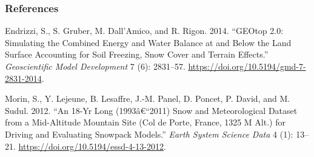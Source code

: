 \documentclass[
]{article}
\newlength{\cslhangindent}
\newenvironment{cslreferences}%
  {\setlength{\parindent}{0pt}%
  \everypar{\setlength{\hangindent}{\cslhangindent}}\ignorespaces}%
  {\par}
\begin{document}
\hypertarget{references}{%
\subsubsection*{References}\label{references}}

\hypertarget{refs}{}
\begin{cslreferences}
\leavevmode\hypertarget{ref-Endrizzi2014}{}%
Endrizzi, S., S. Gruber, M. Dall'Amico, and R. Rigon. 2014. ``GEOtop
2.0: Simulating the Combined Energy and Water Balance at and Below the
Land Surface Accounting for Soil Freezing, Snow Cover and Terrain
Effects.'' \emph{Geoscientific Model Development} 7 (6): 2831--57.
\url{https://doi.org/10.5194/gmd-7-2831-2014}.

\leavevmode\hypertarget{ref-Morin2012}{}%
Morin, S., Y. Lejeune, B. Lesaffre, J.-M. Panel, D. Poncet, P. David,
and M. Sudul. 2012. ``An 18-Yr Long (1993â€``2011) Snow and
Meteorological Dataset from a Mid-Altitude Mountain Site (Col de Porte,
France, 1325 M Alt.) for Driving and Evaluating Snowpack Models.''
\emph{Earth System Science Data} 4 (1): 13--21.
\url{https://doi.org/10.5194/essd-4-13-2012}.
\end{cslreferences}
\end{document}
